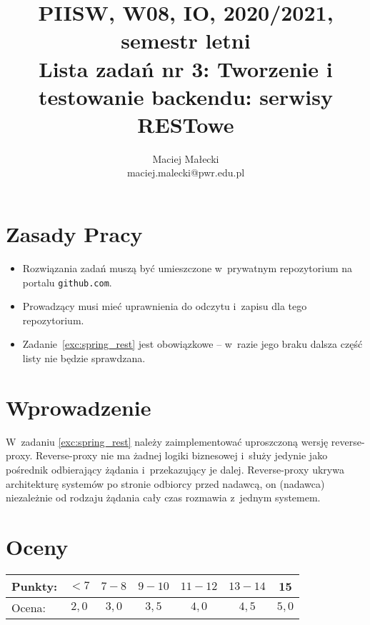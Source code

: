 \documentclass[12pt]{article}
\title{PIISW, W08, IO, 2020/2021, semestr letni\\Lista zadań nr 3: Tworzenie i testowanie backendu: serwisy RESTowe}
\author{Maciej Małecki\\ \small maciej.malecki@pwr.edu.pl}
\begin{document}
    \maketitle

    \section*{Zasady Pracy}
    \begin{itemize}
        \item Rozwiązania zadań muszą być umieszczone w~prywatnym repozytorium na portalu \texttt{git\-hub.com}.
        \item Prowadzący musi mieć uprawnienia do odczytu i~zapisu dla tego repozytorium.
        \item Zadanie~\ref{exc:spring_rest} jest obowiązkowe -- w~razie jego braku dalsza część listy nie będzie sprawdzana.
    \end{itemize}

    \section*{Wprowadzenie}
        W~zadaniu \ref{exc:spring_rest} należy zaimplementować uproszczoną wersję reverse-proxy.
        Reverse-proxy nie ma żadnej logiki biznesowej i~służy jedynie jako pośrednik odbierający żądania i~przekazujący je dalej.
        Reverse-proxy ukrywa architekturę systemów po stronie odbiorcy przed nadawcą, on (nadawca) niezależnie od rodzaju żądania cały czas rozmawia z~jednym systemem.

    \section*{Oceny}
    \begin{tabular}{|l|c|c|c|c|c|c|}
        \hline
        Punkty: & $<7$ & $7-8$ & $9-10$ & $11-12$ & $13-14$ & 15\\
        \hline
        Ocena: & $2,0$ & $3,0$ & $3,5$ & $4,0$ & $4,5$ & $5,0$\\
        \hline
    \end{tabular}
\end{document}
